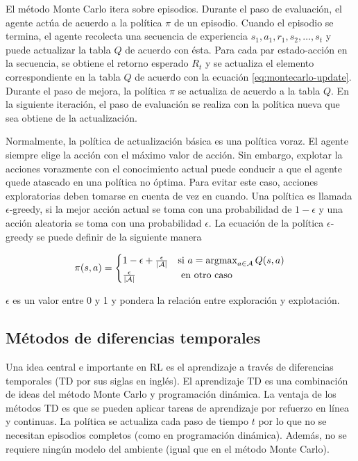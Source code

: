 El método Monte Carlo itera sobre episodios. Durante el paso de evaluación, el 
agente actúa de acuerdo a la política $\pi$ de un episodio. Cuando el 
episodio se termina, el agente recolecta una secuencia de experiencia $s_1, a_1, r_1, s_2, \dots, s_t$ y puede actualizar la tabla $Q$ de acuerdo
con ésta.
Para cada par estado-acción en la secuencia, se obtiene el retorno 
esperado $R_t$ y se actualiza el elemento correspondiente en la tabla $Q$ 
de acuerdo con la ecuación \ref{eq:montecarlo-update}.
Durante el paso de mejora,  la
política $\pi$ se actualiza de acuerdo a la tabla $Q$. En la siguiente iteración,
el paso de evaluación se realiza con la política nueva que sea obtiene de la
actualización.

Normalmente, la política de actualización básica es una política voraz. El agente
siempre elige la acción con el máximo valor de acción. Sin embargo, explotar la acciones vorazmente con el conocimiento actual puede conducir a que el
agente quede atascado en una política no óptima. Para evitar 
este caso, acciones exploratorias deben tomarse en cuenta de vez en cuando.
Una política es llamada $\epsilon$-greedy, si la mejor acción actual se toma 
con una probabilidad de $1-\epsilon$ y una acción aleatoria se toma con una 
probabilidad $\epsilon$. La ecuación de la política $\epsilon$-greedy
se puede definir de la siguiente manera

\[
\pi(s,a) = 
   \begin{cases} 
      1 - \epsilon + \frac{\epsilon}{|\mathcal{A}|} & \mbox{si } a= 
      \operatorname*{argmax}_{a \in \mathcal{A}} 
      Q(s,a)   \\
      \frac{\epsilon}{|\mathcal{A}|} & \mbox{ en otro caso }
   \end{cases}
\]

$\epsilon$ es un valor entre 0 y 1 y pondera la relación entre
exploración y explotación.

\subsection{Métodos de diferencias temporales}

Una idea central e importante en RL es el aprendizaje 
a través de diferencias temporales (TD por sus siglas en inglés).
El aprendizaje TD es una combinación de ideas del método Monte Carlo y programación dinámica. 
La ventaja de los métodos TD es que se pueden aplicar tareas de aprendizaje por refuerzo en línea y continuas.
La política se actualiza cada paso de tiempo $t$ por lo que no se necesitan
episodios completos (como en programación dinámica). Además, no se requiere ningún modelo del ambiente (igual que en el método Monte Carlo). 

